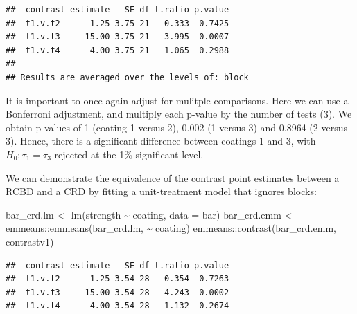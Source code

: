\documentclass[
]{book}
\newenvironment{Shaded}{\begin{snugshade}}{\end{snugshade}}
\newcommand{\AttributeTok}[1]{\textcolor[rgb]{0.77,0.63,0.00}{#1}}
\newcommand{\DecValTok}[1]{\textcolor[rgb]{0.00,0.00,0.81}{#1}}
\newcommand{\FunctionTok}[1]{\textcolor[rgb]{0.00,0.00,0.00}{#1}}
\newcommand{\NormalTok}[1]{#1}
\newcommand{\OtherTok}[1]{\textcolor[rgb]{0.56,0.35,0.01}{#1}}
\newcommand{\SpecialCharTok}[1]{\textcolor[rgb]{0.00,0.00,0.00}{#1}}
\newcommand{\StringTok}[1]{\textcolor[rgb]{0.31,0.60,0.02}{#1}}
\theoremstyle{definition}
\theoremstyle{definition}
\theoremstyle{definition}
\theoremstyle{definition}
\theoremstyle{remark}
\begin{document}
\begin{verbatim}
##  contrast estimate   SE df t.ratio p.value
##  t1.v.t2     -1.25 3.75 21  -0.333  0.7425
##  t1.v.t3     15.00 3.75 21   3.995  0.0007
##  t1.v.t4      4.00 3.75 21   1.065  0.2988
## 
## Results are averaged over the levels of: block
\end{verbatim}

It is important to once again adjust for mulitple comparisons. Here we can use a Bonferroni adjustment, and multiply each p-value by the number of tests (3). We obtain p-values of 1 (coating 1 versus 2), 0.002 (1 versus 3) and 0.8964 (2 versus 3). Hence, there is a significant difference between coatings 1 and 3, with \(H_0: \tau_1 = \tau_3\) rejected at the 1\% significant level.

We can demonstrate the equivalence of the contrast point estimates between a RCBD and a CRD by fitting a unit-treatment model that ignores blocks:

\begin{Shaded}
\begin{Highlighting}[]
\NormalTok{bar\_crd.lm }\OtherTok{\textless{}{-}} \FunctionTok{lm}\NormalTok{(strength }\SpecialCharTok{\textasciitilde{}}\NormalTok{ coating, }\AttributeTok{data =}\NormalTok{ bar)}
\NormalTok{bar\_crd.emm }\OtherTok{\textless{}{-}}\NormalTok{ emmeans}\SpecialCharTok{::}\FunctionTok{emmeans}\NormalTok{(bar\_crd.lm, }\SpecialCharTok{\textasciitilde{}}\NormalTok{ coating)}
\NormalTok{emmeans}\SpecialCharTok{::}\FunctionTok{contrast}\NormalTok{(bar\_crd.emm, }\StringTok{\textquotesingle{}contrastv1\textquotesingle{}}\NormalTok{)}
\end{Highlighting}
\end{Shaded}

\begin{verbatim}
##  contrast estimate   SE df t.ratio p.value
##  t1.v.t2     -1.25 3.54 28  -0.354  0.7263
##  t1.v.t3     15.00 3.54 28   4.243  0.0002
##  t1.v.t4      4.00 3.54 28   1.132  0.2674
\end{verbatim}

\begin{Shaded}
\end{Shaded}
\end{document}
